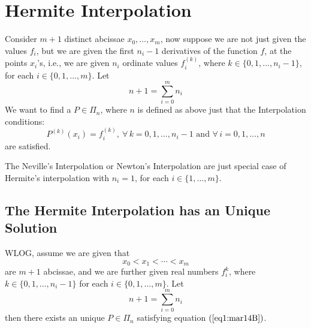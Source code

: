 
\section{Hermite Interpolation}

Consider $m+1$ distinct abcissae $x_0, \dots, x_m$, now suppose we are not just given the values $f_i$, but we are given the first $n_i-1$ derivatives of the function $f$, at the points $x_i$'s, i.e., we are given $n_i$ ordinate values $f_i^{(k)}$, where $k \in \{0,1,\dots,n_i-1\}$, for each $i \in \{0,1,\dots,m\}$. Let 
\[
    n+1 = \sum_{i=0}^m n_i    
\]
We want to find a $P \in \Pi_n$, where $n$ is defined as above just that the Interpolation conditions:
\begin{equation}\label{eq1:mar14B}
    P^{(k)}(x_i) = f_i^{(k)}, \ \forall \, k = 0,1,\dots,n_i-1 \mbox{ and } \forall \, i = 0,1,\dots,n
\end{equation}
are satisfied. 
\begin{rmk}
    The Neville's Interpolation or Newton's Interpolation are just special case of Hermite's interpolation with $n_i = 1$, for each $i \in \{1,\dots,m\}$.
\end{rmk}

\subsection{The Hermite Interpolation has an Unique Solution}

\begin{thm}\label{thm1:mar14B}
    WLOG, assume we are given that 
    \[
        x_0 < x_1 < \cdots < x_m  
    \]
    are $m+1$ abcissae, and we are further given real numbers $f_i^{k}$, where $k \in \{0,1,\dots,n_i-1\}$ for each $i \in \{0,1,\dots,m\}$. Let 
    \[
        n+1 = \sum_{i=0}^m n_i  
    \]
    then there exists an unique $ P \in \Pi_n$ satisfying equation $(\ref{eq1:mar14B})$.
\end{thm}

